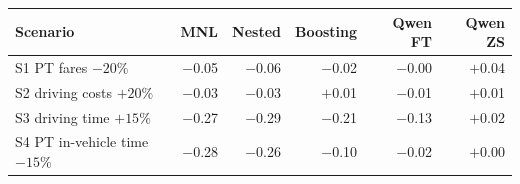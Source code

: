 \begin{tabular}{lrrrrr}
\toprule
Scenario & MNL & Nested & Boosting & Qwen FT & Qwen ZS \\
\midrule
S1 PT fares $-20\%$ & $-$0.05 & $-$0.06 & $-$0.02 & $-$0.00 & $+$0.04 \\
S2 driving costs $+20\%$ & $-$0.03 & $-$0.03 & $+$0.01 & $-$0.01 & $+$0.01 \\
S3 driving time $+15\%$ & $-$0.27 & $-$0.29 & $-$0.21 & $-$0.13 & $+$0.02 \\
S4 PT in-vehicle time $-15\%$ & $-$0.28 & $-$0.26 & $-$0.10 & $-$0.02 & $+$0.00 \\
\bottomrule
\end{tabular}
